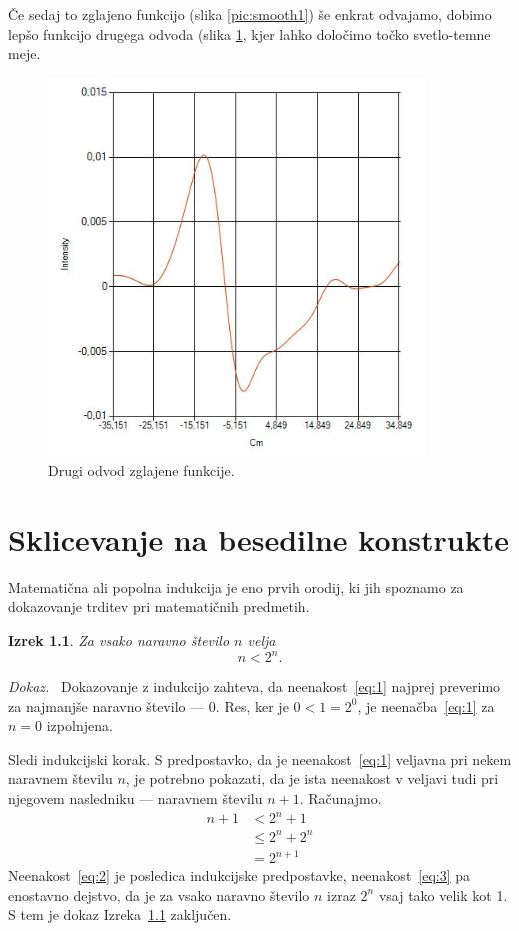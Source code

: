\documentclass[oneside, a4paper, 12pt]{book}
\newtheorem{izrek}{Izrek}[chapter]
\newenvironment{dokaz}{\emph{Dokaz.}\ }{\hspace{\fill}{$\Box$}}
\begin{document}
Če sedaj to zglajeno funkcijo (slika \ref{pic:smooth1}) še enkrat odvajamo, dobimo lepšo funkcijo drugega odvoda (slika \ref{pic:d22}, kjer lahko določimo točko svetlo-temne meje.

\begin{figure}
\begin{center}
\includegraphics[width=10cm]{slike/drugi-odvod-2.jpg}
\end{center}
\caption{Drugi odvod zglajene funkcije.}
\label{pic:d22}
\end{figure}






\chapter{Sklicevanje na besedilne konstrukte}
\label{ch1}
Matematična ali popolna indukcija je eno prvih orodij, ki jih spoznamo za dokazovanje trditev pri matematičnih predmetih. 
\begin{izrek}
\label{iz:1}
Za vsako naravno število $n$ velja
\begin{equation}
n < 2^n.
\label{eq:1}
\end{equation}
\end{izrek}
\begin{dokaz}
Dokazovanje z indukcijo zahteva, da neenakost~\eqref{eq:1} najprej preverimo za najmanjše naravno število --- $0$. Res, ker je $0 < 1 = 2^0$, je neenačba~\eqref{eq:1} za $n=0$ izpolnjena.

Sledi indukcijski korak. S predpostavko, da je neenakost~\eqref{eq:1} veljavna pri nekem naravnem številu $n$, je potrebno pokazati, da je ista neenakost v veljavi tudi pri njegovem nasledniku --- naravnem številu $n+1$. Računajmo.
\begin{align}
n+1 &< 2^n + 1  \label{eq:2}\\
    &\le 2^n + 2^n \label{eq:3}\\
    &= 2^{n+1} \nonumber
\end{align} 
Neenakost~\eqref{eq:2} je posledica indukcijske predpostavke, neenakost~\eqref{eq:3} pa enostavno dejstvo, da je za vsako naravno število $n$ izraz $2^n$ vsaj tako velik kot 1. S tem je dokaz Izreka~\ref{iz:1} zaključen.
\end{dokaz}
\end{document}
